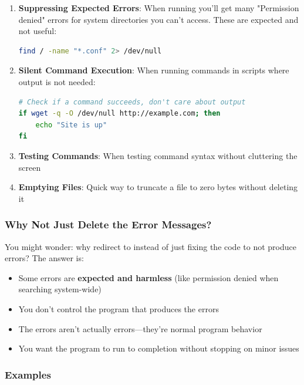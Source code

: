 \begin{enumerate}
	\item \textbf{Suppressing Expected Errors}: When running  you'll get many "Permission denied" errors for system directories you can't access. These are expected and not useful:
	      \begin{lstlisting}[language=bash]
find / -name "*.conf" 2> /dev/null
    \end{lstlisting}

	\item \textbf{Silent Command Execution}: When running commands in scripts where output is not needed:
	      \begin{lstlisting}[language=bash]
# Check if a command succeeds, don't care about output
if wget -q -O /dev/null http://example.com; then
    echo "Site is up"
fi
    \end{lstlisting}

	\item \textbf{Testing Commands}: When testing command syntax without cluttering the screen

	\item \textbf{Emptying Files}: Quick way to truncate a file to zero bytes without deleting it
\end{enumerate}

\subsubsection{Why Not Just Delete the Error Messages?}

You might wonder: why redirect to  instead of just fixing the code to not produce errors? The answer is:
\begin{itemize}
	\item Some errors are \textbf{expected and harmless} (like permission denied when searching system-wide)
	\item You don't control the program that produces the errors
	\item The errors aren't actually errors---they're normal program behavior
	\item You want the program to run to completion without stopping on minor issues
\end{itemize}

\subsubsection{Examples}

